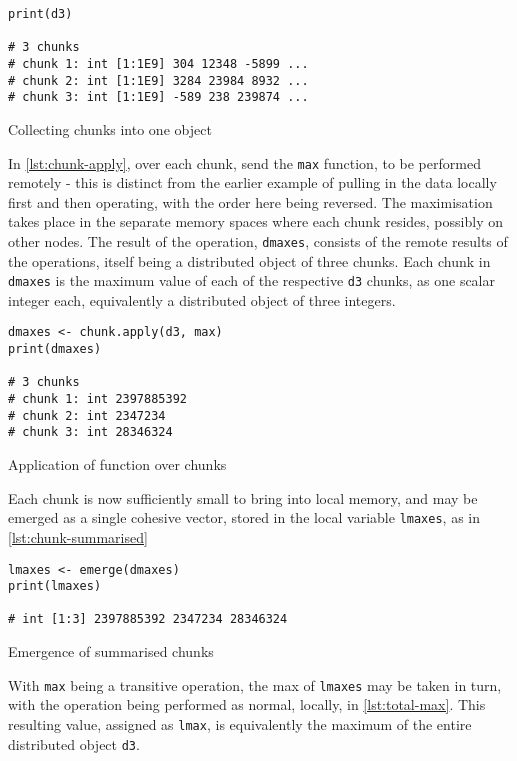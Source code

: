 \begin{listing}
    \begin{verbatim}
print(d3)

# 3 chunks
# chunk 1: int [1:1E9] 304 12348 -5899 ...
# chunk 2: int [1:1E9] 3284 23984 8932 ...
# chunk 3: int [1:1E9] -589 238 239874 ...
    \end{verbatim}
    \caption{Collecting chunks into one object}
    \label{lst:chunk-collection}
\end{listing}

In \cref{lst:chunk-apply}, over each chunk, send the \texttt{max} function, to be performed
remotely - this is distinct from the earlier example of pulling in the
data locally first and then operating, with the order here being
reversed. The maximisation takes place in the separate memory spaces
where each chunk resides, possibly on other nodes. The result of the
operation, \texttt{dmaxes}, consists of the remote results of the
operations, itself being a distributed object of three chunks. Each
chunk in \texttt{dmaxes} is the maximum value of each of the respective
\texttt{d3} chunks, as one scalar integer each, equivalently a
distributed object of three integers.

\begin{listing}
    \begin{verbatim}
dmaxes <- chunk.apply(d3, max)
print(dmaxes)

# 3 chunks
# chunk 1: int 2397885392
# chunk 2: int 2347234
# chunk 3: int 28346324
    \end{verbatim}
    \caption{Application of function over chunks}
    \label{lst:chunk-apply}
\end{listing}

Each chunk is now sufficiently small to bring into local memory, and may
be emerged as a single cohesive vector, stored in the local variable
\texttt{lmaxes}, as in \cref{lst:chunk-summarised}

\begin{listing}
    \begin{verbatim}
lmaxes <- emerge(dmaxes)
print(lmaxes)

# int [1:3] 2397885392 2347234 28346324
    \end{verbatim}
    \caption{Emergence of summarised chunks}
    \label{lst:chunk-summarised}
\end{listing}

With \texttt{max} being a transitive operation, the max of
\texttt{lmaxes} may be taken in turn, with the operation being performed
as normal, locally, in \cref{lst:total-max}. This resulting value, assigned as \texttt{lmax}, is
equivalently the maximum of the entire distributed object \texttt{d3}.

